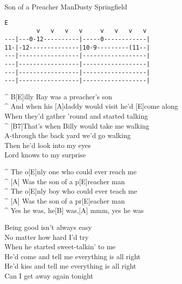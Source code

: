 \begin{song}{Son of a Preacher Man}{Dusty Springfield}

{\scriptsize
\begin{verbatim}
E
         v   v   v   v     v   v   v   v
---|---0-12----------|-----0------------|
11-|-12--------------|10-9---------(11--|
---|-----------------|------------------|
---|-----------------|------------------|
---|-----------------|------------------|
---|-----------------|------------------|
\end{verbatim}
}

\begin{guitar}
^ B[E]illy Ray was a preacher's son\\
^ And when his [A]daddy would visit he'd [E]come along\\
When they'd gather 'round and started talking\\
^ [B7]That's when Billy would take me walking\\
A-through the back yard we'd go walking\\
Then he'd look into my eyes\\
Lord knows to my surprise\\
\end{guitar}

\begin{guitar}
^ The o[E]nly one who could ever reach me\\
^ [A]  Was the son of a p[E]reacher man\\
^ The o[E]nly boy who could ever teach me\\
^ [A]  Was the son of a pr[E]eacher man\\
^ Yes he was, he[B] was,[A]     mmm, yes he was\\
\end{guitar}


\begin{guitar}
Being good isn't always easy\\
No matter how hard I'd try\\
When he started sweet-talkin' to me\\
He'd come and tell me everything is all right\\
He'd kiss and tell me everything is all right\\
Can I get away again tonight\\
\end{guitar}


\end{song}
